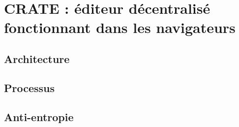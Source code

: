
\section{CRATE : éditeur décentralisé fonctionnant dans les navigateurs}

\subsection{Architecture}

\subsection{Processus}

\subsection{Anti-entropie}
